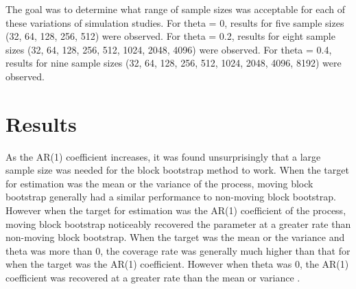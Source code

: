\documentclass[12pt, letterpaper, titlepage]{article}
\begin{document}
The goal was to determine what range of sample sizes was acceptable for each of these variations of simulation studies. For theta = 0, results for five sample sizes (32, 64, 128, 256, 512) were observed. For theta = 0.2, results for eight sample sizes (32,  64, 128, 256, 512, 1024, 2048, 4096) were observed. For theta = 0.4, results for nine sample sizes (32, 64, 128, 256, 512, 1024, 2048, 4096, 8192) were observed.



 

\section{Results}
\label{sec:results}

As the AR(1) coefficient increases, it was found unsurprisingly that a large sample size was needed for the block bootstrap method to work. When the target for estimation was the mean or the variance of the process, moving block bootstrap generally had a similar performance to non-moving block bootstrap. However when the target for estimation was the AR(1) coefficient of the process, moving block bootstrap noticeably recovered the parameter at a greater rate than non-moving block bootstrap. When the target was the mean or the variance and theta was more than 0, the coverage rate was generally much higher than that for when the target was the AR(1) coefficient. However when theta was 0, the AR(1) coefficient was recovered at a greater rate than the mean or variance . 
\end{document}
